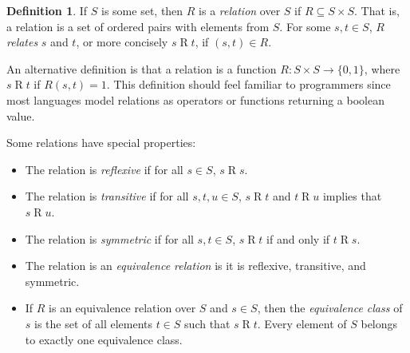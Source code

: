 \documentclass[headsepline,bibliography=totoc]{scrreport}
\theoremstyle{definition}
\theoremstyle{definition}
\newtheorem{definition}{Definition}[chapter]
\theoremstyle{definition}
\begin{document}
\begin{definition}\label{relationdef} If $S$ is some set, then $R$ is a \emph{relation} over $S$ if $R\subseteq S\times S$. That is, a relation is a set of ordered pairs with elements from $S$. For some $s, t\in S$, $R$ \emph{relates} $s$ and $t$, or more concisely $s\mathrel{R}t$, if $(s, t)\in R$.

An alternative definition is that a relation is a function $R\colon S\times S \rightarrow \{0, 1\}$, where $s\mathrel{R}t$ if $R(s, t)=1$. This definition should feel familiar to programmers since most languages model relations as operators or functions returning a boolean value.

Some relations have special properties:
\begin{itemize}
\item The relation is \emph{reflexive} if for all $s\in S$, $s\mathrel{R}s$.
\item The relation is \emph{transitive} if for all $s, t, u\in S$, $s\mathrel{R}t$ and $t\mathrel{R}u$ implies that $s\mathrel{R}u$.
\item The relation is \emph{symmetric} if for all $s, t\in S$, $s\mathrel{R}t$ if and only if $t\mathrel{R}s$.
\item The relation is an \emph{equivalence relation} is it is reflexive, transitive, and symmetric.
\item If $R$ is an equivalence relation over $S$ and $s\in S$, then the \emph{equivalence class} of $s$ is the set of all elements $t\in S$ such that $s\mathrel{R}t$. Every element of $S$ belongs to exactly one equivalence class.
\end{itemize}
\end{definition}
\end{document}
